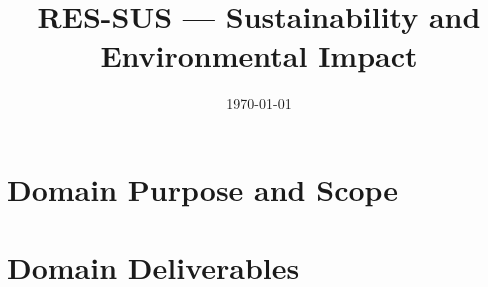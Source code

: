 \documentclass[12pt,a4paper]{article}
\title{RES-SUS --- Sustainability and Environmental Impact}
\author{}
\date{\today}
\begin{document}
\maketitle

\tableofcontents
\clearpage

\section{Domain Purpose and Scope}
\label{sec:res-sus-domain-purpose}


\section{Domain Deliverables}
\label{sec:res-sus-domain-deliverables}




\clearpage
\printbibliography[
  heading=bibintoc,
  title={References}
]
\end{document}
